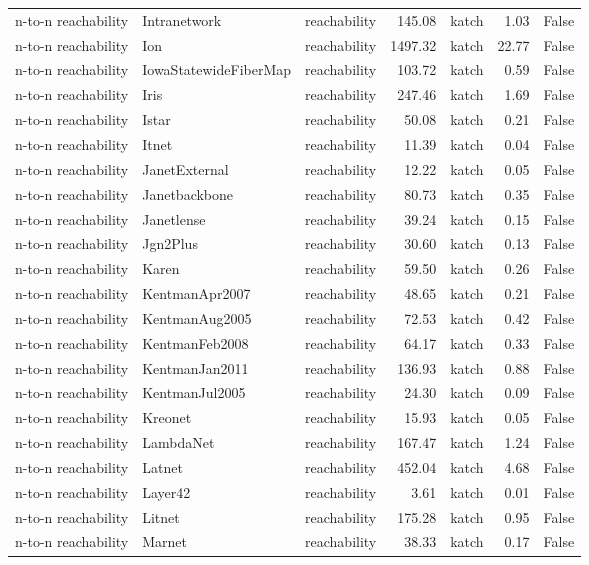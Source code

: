 \begin{tabular}{lllrlrr}
n-to-n reachability & Intranetwork & reachability & 145.08 & katch & 1.03 & False \\
n-to-n reachability & Ion & reachability & 1497.32 & katch & 22.77 & False \\
n-to-n reachability & IowaStatewideFiberMap & reachability & 103.72 & katch & 0.59 & False \\
n-to-n reachability & Iris & reachability & 247.46 & katch & 1.69 & False \\
n-to-n reachability & Istar & reachability & 50.08 & katch & 0.21 & False \\
n-to-n reachability & Itnet & reachability & 11.39 & katch & 0.04 & False \\
n-to-n reachability & JanetExternal & reachability & 12.22 & katch & 0.05 & False \\
n-to-n reachability & Janetbackbone & reachability & 80.73 & katch & 0.35 & False \\
n-to-n reachability & Janetlense & reachability & 39.24 & katch & 0.15 & False \\
n-to-n reachability & Jgn2Plus & reachability & 30.60 & katch & 0.13 & False \\
n-to-n reachability & Karen & reachability & 59.50 & katch & 0.26 & False \\
n-to-n reachability & KentmanApr2007 & reachability & 48.65 & katch & 0.21 & False \\
n-to-n reachability & KentmanAug2005 & reachability & 72.53 & katch & 0.42 & False \\
n-to-n reachability & KentmanFeb2008 & reachability & 64.17 & katch & 0.33 & False \\
n-to-n reachability & KentmanJan2011 & reachability & 136.93 & katch & 0.88 & False \\
n-to-n reachability & KentmanJul2005 & reachability & 24.30 & katch & 0.09 & False \\
n-to-n reachability & Kreonet & reachability & 15.93 & katch & 0.05 & False \\
n-to-n reachability & LambdaNet & reachability & 167.47 & katch & 1.24 & False \\
n-to-n reachability & Latnet & reachability & 452.04 & katch & 4.68 & False \\
n-to-n reachability & Layer42 & reachability & 3.61 & katch & 0.01 & False \\
n-to-n reachability & Litnet & reachability & 175.28 & katch & 0.95 & False \\
n-to-n reachability & Marnet & reachability & 38.33 & katch & 0.17 & False \\

\end{tabular}
